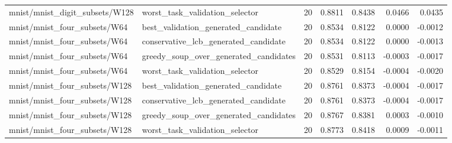 \begin{tabular}{lllrrrr}
mnist/mnist\_digit\_subsets/W128 & worst\_task\_validation\_selector & 20 & 0.8811 & 0.8438 & 0.0466 & 0.0435 \\
mnist/mnist\_four\_subsets/W64 & best\_validation\_generated\_candidate & 20 & 0.8534 & 0.8122 & 0.0000 & -0.0012 \\
mnist/mnist\_four\_subsets/W64 & conservative\_lcb\_generated\_candidate & 20 & 0.8534 & 0.8122 & 0.0000 & -0.0013 \\
mnist/mnist\_four\_subsets/W64 & greedy\_soup\_over\_generated\_candidates & 20 & 0.8531 & 0.8113 & -0.0003 & -0.0017 \\
mnist/mnist\_four\_subsets/W64 & worst\_task\_validation\_selector & 20 & 0.8529 & 0.8154 & -0.0004 & -0.0020 \\
mnist/mnist\_four\_subsets/W128 & best\_validation\_generated\_candidate & 20 & 0.8761 & 0.8373 & -0.0004 & -0.0017 \\
mnist/mnist\_four\_subsets/W128 & conservative\_lcb\_generated\_candidate & 20 & 0.8761 & 0.8373 & -0.0004 & -0.0017 \\
mnist/mnist\_four\_subsets/W128 & greedy\_soup\_over\_generated\_candidates & 20 & 0.8767 & 0.8381 & 0.0003 & -0.0010 \\
mnist/mnist\_four\_subsets/W128 & worst\_task\_validation\_selector & 20 & 0.8773 & 0.8418 & 0.0009 & -0.0011 \\
\bottomrule
\end{tabular}
